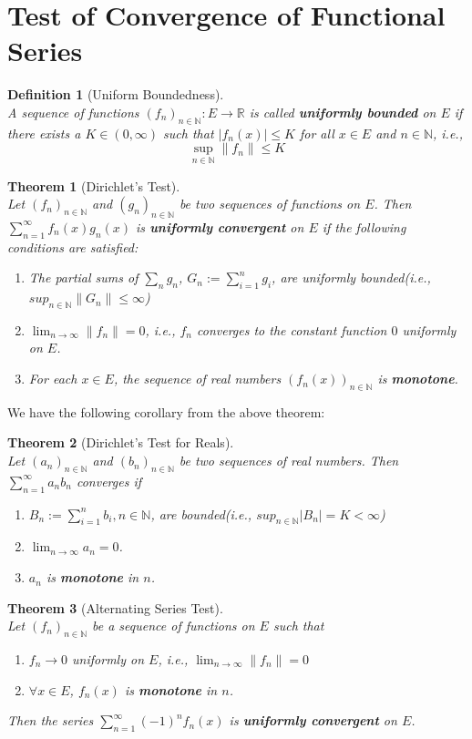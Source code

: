 \documentclass[12pt]{article}
\newtheorem{definition}{Definition}[section]
\newtheorem{theorem}{Theorem}[section]
\theoremstyle{definition}
\begin{document}
\section{Test of Convergence of Functional Series}
\begin{definition}[Uniform Boundedness]
\hfill\\\normalfont A sequence of functions $(f_n)_{n\in\mathbb{N}}: E\to\mathbb{R}$ is called \textbf{uniformly bounded} on $E$ if there exists a $K\in(0,\infty)$ such that $|f_n(x)|\leq K$ for all $x\in E$ and $n\in\mathbb{N}$, i.e.,
\[
\sup_{n\in\mathbb{N}}\|f_n\|\leq K
\]
\end{definition}
\begin{theorem}[Dirichlet's Test]
\hfill\\\normalfont Let $(f_n)_{n\in\mathbb{N}}$ and $(g_n)_{n\in\mathbb{N}}$ be two sequences of functions on $E$. Then $\sum_{n=1}^\infty f_n(x)g_n(x)$ is \textbf{uniformly convergent} on $E$ if the following conditions are satisfied:
\begin{enumerate}
	\item The partial sums of $\sum_{n}g_n$, $G_n:=\sum_{i=1}^n g_i$, are uniformly bounded(i.e., $sup_{n\in\mathbb{N}}\|G_n\|\leq \infty$)
	\item $\lim_{n\to\infty}\|f_n\|=0$, i.e., $f_n$ converges to the constant function $0$ uniformly on $E$.
	\item For each $x\in E$, the sequence of real numbers $(f_n(x))_{n\in\mathbb{N}}$ is \textbf{monotone}.
\end{enumerate}
\end{theorem}
We have the following corollary from the above theorem:
\begin{theorem}[Dirichlet's Test for Reals]
\hfill\\\normalfont Let $(a_n)_{n\in\mathbb{N}}$ and $(b_n)_{n\in\mathbb{N}}$ be two sequences of real numbers. Then $\sum_{n=1}^\infty a_nb_n$ converges if
\begin{enumerate}
	\item $B_n:=\sum_{i=1}^n b_i, n\in\mathbb{N}$, are bounded(i.e., $sup_{n\in\mathbb{N}}|B_n|=K<\infty$)
	\item $\lim_{n\to\infty}a_n=0$.
	\item $a_n$ is \textbf{monotone} in $n$.
\end{enumerate}
\end{theorem}
\begin{theorem}[Alternating Series Test]
\hfill\\\normalfont Let $(f_n)_{n\in\mathbb{N}}$ be a sequence of functions on $E$ such that
\begin{enumerate}
	\item $f_n\to 0$ uniformly on $E$, i.e., $\lim_{n\to\infty}\|f_n\|=0$
	\item $\forall x\in E$, $f_n(x)$ is \textbf{monotone} in $n$.
\end{enumerate}
Then the series $\sum_{n=1}^\infty (-1)^n f_n(x)$ is \textbf{uniformly convergent} on $E$.
\end{theorem}
\end{document}
